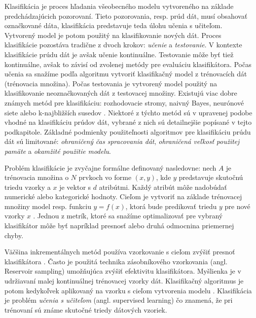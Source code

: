 \par
Klasifikácia je proces hľadania všeobecného modelu vytvoreného na základe predchádzajúcich pozorovaní. Tieto pozorovania, resp. prúd dát, musí obsahovať označkované dáta, klasifikácia predstavuje teda úlohu učenia s učiteľom. Vytvorený model je potom použitý na klasifikovanie nových dát. Proces klasifikácie pozostáva tradične z dvoch krokov: \textit{učenie} a \textit{testovanie}. V kontexte klasifikácie prúdu dát je avšak učenie kontinuálne. Testovanie môže byť tiež kontinuálne, avšak to závisí od zvolenej metódy pre evaluáciu klasifikátora. Počas učenia sa snažíme podľa algoritmu vytvoriť klasifikačný model z trénovacích dát (trénovacia množina). Počas testovania je vytvorený model použitý na klasifikovanie neoznačkovaných dát z testovacej množiny. Existujú viac dobre známych metód pre klasifikáciu: rozhodovacie stromy, naivný Bayes, neurónové siete alebo k-najbližších susedov \citep{nguyen2015survey}. Niektoré z týchto metód sú v upravenej podobe vhodné na klasifikáciu prúdov dát, vybrané z nich sú detailnejšie popísané v tejto podkapitole. Základné podmienky použiteľnosti algoritmov pre klasifikáciu prúdu dát sú limitované: \textit{ohraničený čas spracovania dát}, \textit{ohraničená veľkosť použitej pamäte} a \textit{okamžité použitie modelu}.
\par
Problém klasifikácie je zvyčajne formálne definovaný nasledovne: nech $A$ je trénovacia množina o $N$ prvkoch vo forme $(x,y)$, kde $y$ predstavuje skutočnú triedu vzorky a $x$ je vektor s $d$ atribútmi. Každý atribút môže nadobúdať numerické alebo kategorické hodnoty. Cieľom je vytvoriť na základe trénovacej množiny model resp. funkciu $y=f(x)$, ktorá bude predikovať triedu $y$ pre nové vzorky $x$ \citep{domingos2000mining}. Jednou z metrík, ktoré sa snažíme optimalizovať pre vybraný klasifikátor môže byť napríklad presnosť alebo druhá odmocnina priemernej chyby.
\par
Väčšina inkrementálnych metód používa vzorkovanie s cieľom zvýšiť presnoť klasifikátora \citep{aggarwal2014survey, nguyen2015survey}. Často je použitá technika zásobníkového vzorkovania (angl. Reservoir sampling) umožňujúca zvýšiť efektivitu klasifikátora. Myšlienka je v udržiavaní malej kontinuálnej trénovacej vzorky dát. Klasifikačný algoritmus je potom kedykoľvek aplikovaný na vzorku s cieľom vytvorenia modelu \citep{aggarwal2014survey}. Klasifikácia je problém \textit{učenia s učiteľom} (angl. supervised learning) čo znamená, že pri trénovaní sú známe skutočné triedy dátových vzoriek.

